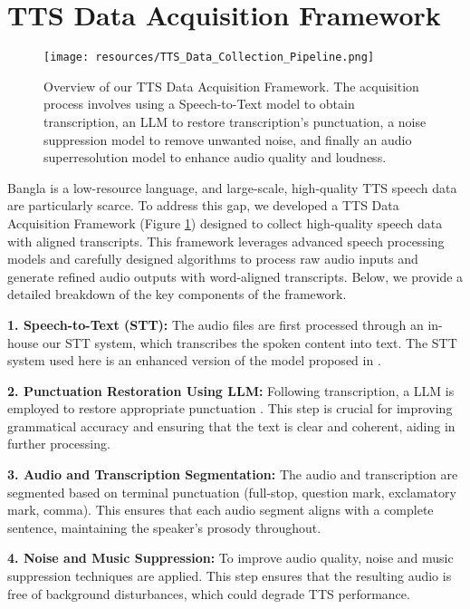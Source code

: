 
\section{TTS Data Acquisition Framework}
\label{sec:data_collection}

\begin{figure}[hbt!]
    \centering
    \texttt{[image: resources/TTS\_Data\_Collection\_Pipeline.png]} 
    \caption{Overview of our TTS Data Acquisition Framework. The acquisition process involves using a Speech-to-Text model to obtain transcription, an LLM to restore transcription's punctuation, a noise suppression model to remove unwanted noise, and finally an audio superresolution model to enhance audio quality and loudness.}
    \label{fig:pseudo_labeled_dataset}
\end{figure}

Bangla is a low-resource language, and large-scale, high-quality TTS speech data are particularly scarce. To address this gap, we developed a TTS Data Acquisition Framework (Figure \ref{fig:pseudo_labeled_dataset}) designed to collect high-quality speech data with aligned transcripts. This framework leverages advanced speech processing models and carefully designed algorithms to process raw audio inputs and generate refined audio outputs with word-aligned transcripts. Below, we provide a detailed breakdown of the key components of the framework.


\textbf{1. Speech-to-Text (STT):} The audio files are first processed through an in-house our STT system, which transcribes the spoken content into text. The STT system used here is an enhanced version of the model proposed in \cite{nandi-etal-2023-pseudo}.

\textbf{2. Punctuation Restoration Using LLM:} Following transcription, a LLM is employed to restore appropriate punctuation \cite{openai2023gpt}. This step is crucial for improving grammatical accuracy and ensuring that the text is clear and coherent, aiding in further processing.

\textbf{3. Audio and Transcription Segmentation:} The audio and transcription are segmented based on terminal punctuation (full-stop, question mark, exclamatory mark, comma). This ensures that each audio segment aligns with a complete sentence, maintaining the speaker's prosody throughout.

\textbf{4. Noise and Music Suppression:} To improve audio quality, noise and music suppression techniques \cite{defossez2019music} are applied. This step ensures that the resulting audio is free of background disturbances, which could degrade TTS performance.

